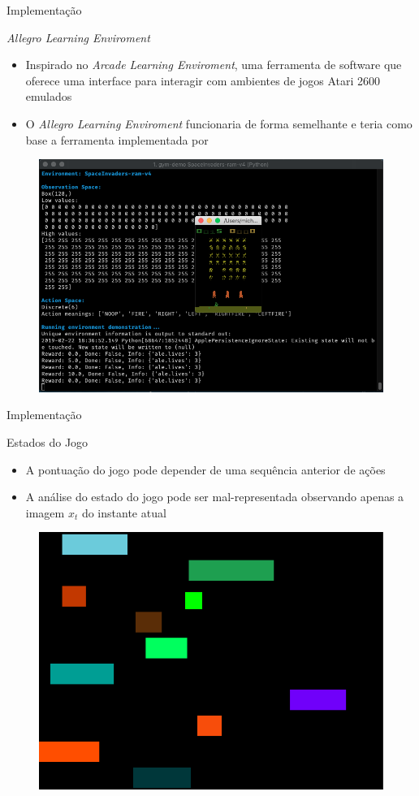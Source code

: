\documentclass[aspectratio=169]{beamer}
\begin{document}
\begin{frame}{Implementação}
	\begin{block}{\textit{Allegro Learning Enviroment}}
		\begin{itemize}
			\item Inspirado no \textit{Arcade Learning Enviroment}, uma ferramenta de software que oferece uma interface para interagir com ambientes de jogos Atari 2600 emulados

			\item O \textit{Allegro Learning Enviroment} funcionaria de forma semelhante e teria como base a ferramenta implementada por \cite{silva:amb-jd-allegro}
		\end{itemize}
	\end{block}
	\begin{figure}
		\centering
		\includegraphics[width=.4 \textwidth]{imgs/gym_demo.png}
	\end{figure}
\end{frame}

\begin{frame}{Implementação}
	\begin{block}{Estados do Jogo}
		\begin{itemize}
			\item A pontuação do jogo pode depender de uma sequência anterior de ações
			\item A análise do estado do jogo pode ser mal-representada observando apenas a imagem $x_t$ do instante atual
		\end{itemize}
	\end{block}

	\begin{figure}
		\centering
		\includegraphics[width=.4 \textwidth]{imgs/gifs/frogger_epi_best_8.png}
	\end{figure}
	
\end{frame}
\end{document}
